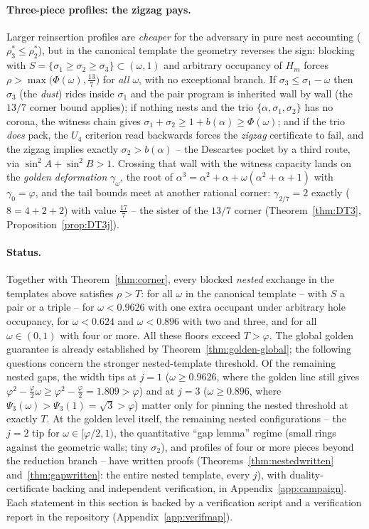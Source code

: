 \documentclass[11pt]{article}
\theoremstyle{definition}
\begin{document}
\paragraph{Three-piece profiles: the zigzag pays.}
Larger reinsertion profiles are \emph{cheaper} for the adversary in pure
nest accounting ($\rho^*_3\le\rho^*_2$), but in the canonical template the
geometry reverses the sign: blocking with $S=\{\sigma_1\ge\sigma_2\ge
\sigma_3\}\subset(\omega,1)$ and arbitrary occupancy of $H_m$ forces
$\rho>\max\bigl(\Phi(\omega),\tfrac{13}7\bigr)$ for \emph{all} $\omega$,
with no exceptional branch. If $\sigma_3\le\sigma_1-\omega$ then $\sigma_3$ (the \emph{dust}) rides
inside $\sigma_1$ and the pair program is inherited wall by wall
(the $13/7$ corner bound applies); if nothing nests and the trio
$\{\alpha,\sigma_1,\sigma_2\}$ has no corona, the witness chain gives
$\sigma_1+\sigma_2\ge1+b(\alpha)\ge\Phi(\omega)$; and if the trio
\emph{does} pack, the $U_4$ criterion read backwards forces the \emph{zigzag}
certificate to fail, and the zigzag implies exactly $\sigma_2>b(\alpha)$
-- the Descartes pocket by a third route, via
$\sin^2\!A+\sin^2\!B>1$. Crossing that wall with the witness capacity
lands on the \emph{golden deformation} $\gamma_\omega$, the root of
$\alpha^3=\alpha^2+\alpha+\omega(\alpha^2+\alpha+1)$ with
$\gamma_0=\varphi$, and the tail bounds meet at another rational corner:
$\gamma_{2/7}=2$ exactly ($8=4+2+2$) with value $\tfrac{17}7$ -- the
sister of the $13/7$ corner
(Theorem~\ref{thm:DT3}, Proposition~\ref{prop:DT3j}).

\paragraph{Status.}
Together with Theorem~\ref{thm:corner}, every blocked \emph{nested}
exchange in the templates above satisfies $\rho>T$: for all $\omega$ in
the canonical template -- with $S$ a pair or a triple -- for
$\omega<0.9626$ with one extra occupant under arbitrary hole occupancy,
for $\omega<0.624$ and $\omega<0.896$ with two and three, and for all
$\omega\in(0,1)$ with four or more. All these floors exceed $T>\varphi$. The global golden guarantee is
already established by Theorem~\ref{thm:golden-global}; the following
questions concern the stronger nested-template threshold. Of the
remaining nested gaps, the width tips at $j=1$ ($\omega\ge0.9626$,
where the golden line still gives $\varphi^2-\tfrac\varphi2\omega
\ge\varphi^2-\tfrac\varphi2=1.809>\varphi$) and at $j=3$
($\omega\ge0.896$, where $\Psi_3(\omega)>\Psi_3(1)=\sqrt3>\varphi$)
matter only for pinning the nested threshold at exactly $T$. At the
golden level itself, the remaining nested configurations -- the
$j=2$ tip for $\omega\in[\varphi/2,1)$, the quantitative ``gap
lemma'' regime (small rings against the geometric walls; tiny
$\sigma_2$), and profiles of four or more pieces beyond the
reduction branch -- have written proofs
(Theorems~\ref{thm:nestedwritten} and~\ref{thm:gapwritten}: the
entire nested template, every $j$), with duality-certificate
backing and independent verification, in
Appendix~\ref{app:campaign}. Each statement in this section is
backed by a verification script and a verification report in the
repository (Appendix~\ref{app:verifmap}).
\end{document}
